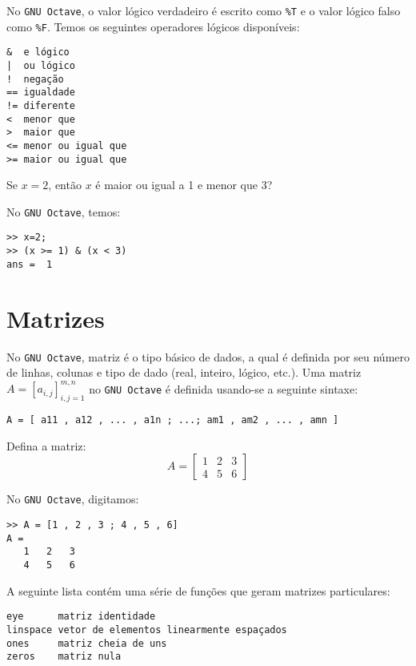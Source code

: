 No \verb+GNU Octave+, o valor lógico verdadeiro é escrito como \verb+%T+ e o valor lógico falso como \verb+%F+. Temos os seguintes operadores lógicos disponíveis:
\begin{verbatim}
&  e lógico
|  ou lógico
!  negação
== igualdade
!= diferente
<  menor que
>  maior que
<= menor ou igual que
>= maior ou igual que
\end{verbatim}

\begin{ex}
  Se $x=2$, então $x$ é maior ou igual a 1 e menor que 3? 
\end{ex}
\begin{sol}
  No \verb+GNU Octave+, temos:
\begin{verbatim}
>> x=2;
>> (x >= 1) & (x < 3)
ans =  1
\end{verbatim}
\end{sol}

\section{Matrizes}

No \verb+GNU Octave+, matriz é o tipo básico de dados, a qual é definida por seu número de linhas, colunas e tipo de dado (real, inteiro, lógico, etc.). Uma matriz $A = [a_{i,j}]_{i,j=1}^{m,n}$ no \verb+GNU Octave+ é definida usando-se a seguinte sintaxe:
\begin{verbatim}
A = [ a11 , a12 , ... , a1n ; ...; am1 , am2 , ... , amn ]
\end{verbatim}

\begin{ex}
  Defina a matriz:
  \begin{equation*}
    A = \left[
      \begin{array}{ccc}
        1 & 2 & 3\\
        4 & 5 & 6
      \end{array}
\right]
  \end{equation*}
\end{ex}
\begin{sol}
  No \verb+GNU Octave+, digitamos:
\begin{verbatim}
>> A = [1 , 2 , 3 ; 4 , 5 , 6]
A =
   1   2   3
   4   5   6
\end{verbatim}
\end{sol}

A seguinte lista contém uma série de funções que geram matrizes particulares:
\begin{verbatim}
eye      matriz identidade
linspace vetor de elementos linearmente espaçados
ones     matriz cheia de uns
zeros    matriz nula
\end{verbatim}

